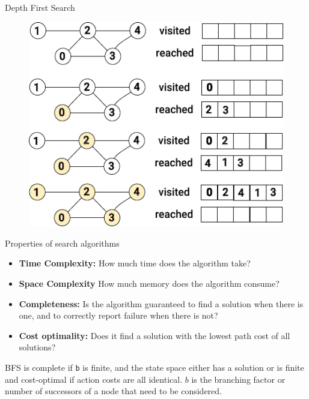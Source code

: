 \documentclass[aspectratio=169,8pt]{beamer}
\begin{document}
\begin{frame}[fragile]{Depth First Search}
  \begin{center}
    \begin{figure}
      \includegraphics{dfs}
    \end{figure}
  \end{center}
\end{frame}
\begin{frame}{Properties of search algorithms}
  \begin{itemize}
  \item {\bf Time Complexity:} How much time does the algorithm take?
  \item {\bf Space Complexity} How much memory does the algorithm consume?
  \item {\bf Completeness:} Is the algorithm guaranteed to find a solution when there is one, and
    to correctly report failure when there is not?
  \item {\bf Cost optimality:} Does it find a solution with the lowest path cost of all solutions?
  \end{itemize}

  BFS is complete if {\tt b} is finite, and the state space either has a solution or is finite
  and cost-optimal if action costs are all identical. $b$ is the branching factor or number of
  successors of a node that need to be considered.
\end{frame}
\end{document}
